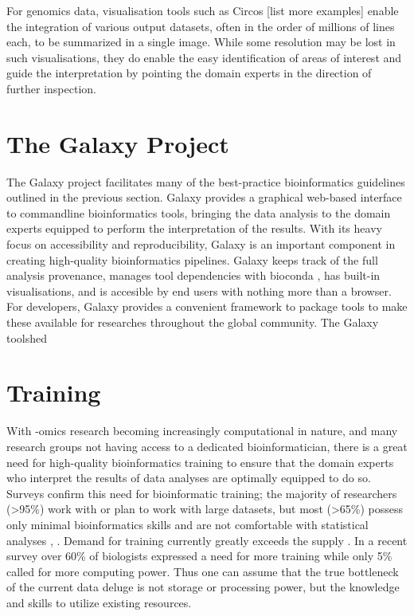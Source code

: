 For genomics data, visualisation tools such as Circos \cite{circos} [list more examples] enable the integration of various output datasets, often in the order of millions of lines each, to be summarized in a single image. While some resolution may be lost in such visualisations, they do enable the easy identification of areas of interest and guide the interpretation by pointing the domain experts in the direction of further inspection.


\section{The Galaxy Project}
The Galaxy project \cite{afgan2016galaxy} facilitates many of the best-practice bioinformatics guidelines outlined in the previous section. Galaxy provides a graphical web-based interface to commandline bioinformatics tools, bringing the data analysis to the domain experts equipped to perform the interpretation of the results. With its heavy focus on accessibility and reproducibility, Galaxy is an important component in creating high-quality bioinformatics pipelines. Galaxy keeps track of the full analysis provenance, manages tool dependencies with bioconda \cite{}, has built-in visualisations, and is accesible by end users with nothing more than a browser. For developers, Galaxy provides a convenient framework to package tools to make these available for researches throughout the global community. The Galaxy toolshed

\section{Training}
With -omics research becoming increasingly computational in nature, and many research groups not having access to a dedicated bioinformatician, there is a great need for high-quality bioinformatics training to ensure that the domain experts who interpret the results of data analyses are optimally equipped to do so. Surveys confirm this need for bioinformatic training; the majority of researchers (>95\%) work with or plan to work with large datasets, but most (>65\%) possess only minimal bioinformatics skills and are not comfortable with statistical analyses \cite{larcombe2017elixir}, \cite{williams2017vision}. Demand for training currently greatly exceeds the supply \cite{attwood2017global}. In a recent survey \cite{survey2013embl} over 60\% of biologists expressed a need for more training while only 5\% called for more computing power. Thus one can assume that the true bottleneck of the current data deluge is not storage or processing power, but the knowledge and skills to utilize existing resources.

